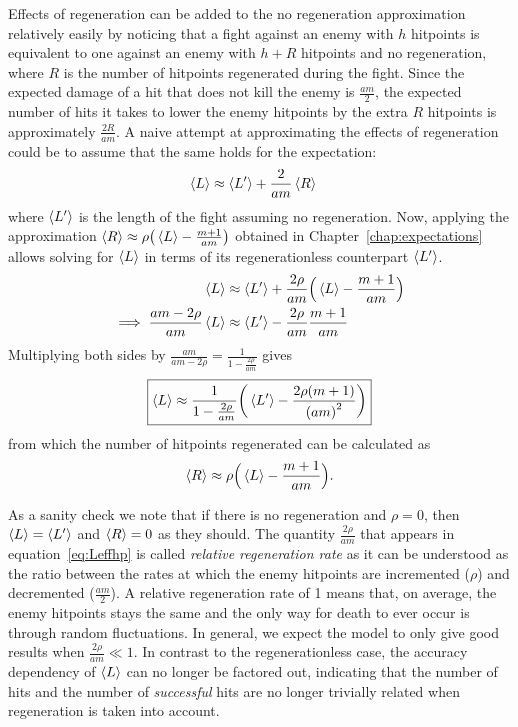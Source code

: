 Effects of regeneration can be added to the no regeneration approximation relatively easily by noticing that a fight against an enemy with $h$ hitpoints is equivalent to one against an enemy with $h+R$ hitpoints and no regeneration, where $R$ is the number of hitpoints regenerated during the fight. Since the expected damage of a hit that does not kill the enemy is $\frac{am}{2}$, the expected number of hits it takes to lower the enemy hitpoints by the extra $R$ hitpoints is approximately $\frac{2R}{am}$. A naive attempt at approximating the effects of regeneration could be to assume that the same holds for the expectation:
\begin{align}
	\left\langle L \right\rangle &\approx \left\langle L' \right\rangle + \frac{2}{am}\left\langle R \right\rangle
\end{align}
where $\left\langle L' \right\rangle$ is the length of the fight assuming no regeneration.
Now, applying the approximation $\left\langle R \right\rangle \approx \rho\big(\left\langle L \right\rangle-\frac{m+1}{am}\big)$ obtained in Chapter~\ref{chap:expectations} allows solving for $\left\langle L \right\rangle$ in terms of its regenerationless counterpart $\left\langle L' \right\rangle$.
\begin{align*}
	\left\langle L \right\rangle &\approx \left\langle L' \right\rangle + \frac{2\rho}{am}\Big(\left\langle L \right\rangle-\frac{m+1}{am}\Big)\\
	\implies \frac{am-2\rho}{am}\left\langle L \right\rangle &\approx \left\langle L' \right\rangle - \frac{2\rho}{am}\frac{m+1}{am}
\end{align*}
Multiplying both sides by $\frac{am}{am-2\rho} = \frac{1}{1-\frac{2\rho}{am}}$ gives
\begin{equation}
	\boxed{\left\langle L \right\rangle \approx
		\frac{1}{1-\frac{2\rho}{am}}\bigg(\left\langle L' \right\rangle - \frac{2\rho(m+1)}{{(am)}^2}\bigg)
	}\label{eq:Leffhp}
\end{equation}
from which the number of hitpoints regenerated can be calculated as
\begin{equation}
	\left\langle R \right\rangle \approx \rho\Big(\left\langle L \right\rangle-\frac{m+1}{am}\Big)\label{eq:Reffhp}.
\end{equation}

As a sanity check we note that if there is no regeneration and $\rho=0$, then $\left\langle L \right\rangle = \left\langle L' \right\rangle$ and $\left\langle R \right\rangle=0$ as they should. The quantity $\frac{2\rho}{am}$ that appears in equation~\ref{eq:Leffhp} is called \emph{relative regeneration rate} as it can be understood as the ratio between the rates at which the enemy hitpoints are incremented ($\rho$) and decremented ($\frac{am}{2}$). A relative regeneration rate of 1 means that, on average, the enemy hitpoints stays the same and the only way for death to ever occur is through random fluctuations. In general, we expect the model to only give good results when $\frac{2\rho}{am} \ll 1$. In contrast to the regenerationless case, the accuracy dependency of $\left\langle L \right\rangle$ can no longer be factored out, indicating that the number of hits and the number of \emph{successful} hits are no longer trivially related when regeneration is taken into account.
